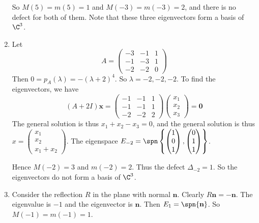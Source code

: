 \documentclass[a4paper]{article}
\begin{document}
\begin{eg}
\begin{enumerate}
          So $M(5) = m(5) = 1$ and $M(-3) = m(-3) = 2$, and there is no defect for both of them. Note that these three eigenvectors form a basis of $\C^3$.
        \item Let
          \[
            A = \begin{pmatrix}
              -3&-1&1\\
              -1 & -3 & 1\\
              -2 & -2 & 0
            \end{pmatrix}
          \]
          Then $0 = p_A(\lambda) = -(\lambda+2)^4$. So $\lambda = -2, -2, -2$. To find the eigenvectors, we have
          \[
            (A + 2I)\mathbf{x} = 
            \begin{pmatrix}
              -1&-1&1\\
              -1 & -1 & 1\\
              -2 & -2 & 2
            \end{pmatrix}
            \begin{pmatrix}
              x_1\\x_2\\x_3
            \end{pmatrix}
            = \mathbf{0}
          \]
          The general solution is thus $x_1 + x_2 - x_3 = 0$, and the general solution is thus $x = 
          \begin{pmatrix}
            x_1\\x_2\\x_1 + x_2
          \end{pmatrix}$. The eigenspace $E_{-2} = \spn\left\{
            \begin{pmatrix}
              1\\0\\1
            \end{pmatrix}, 
            \begin{pmatrix}
              0\\1\\1
            \end{pmatrix}\right\}$.

            Hence $M(-2) = 3$ and $m(-2) = 2$. Thus the defect $\Delta_{-2} = 1$. So the eigenvectors do not form a basis of $\C^3$.
          \item Consider the reflection $R$ in the plane with normal $\mathbf{n}$. Clearly $R\mathbf{n} = -\mathbf{n}$. The eigenvalue is $-1$ and the eigenvector is $\mathbf{n}$. Then $E_1 = \spn\{\mathbf{n}\}$. So $M(-1) = m(-1) = 1$.


\end{enumerate}
\end{eg}
\end{document}
